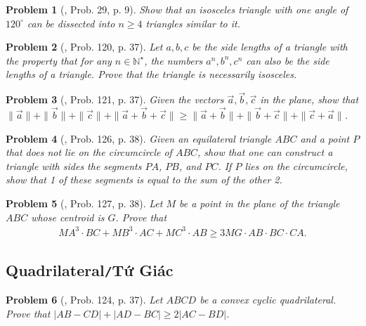 \documentclass[oneside]{book}
\numberwithin{equation}{section}
\newtheorem{problem}{Problem}[section]
\begin{document}
\begin{problem}[\cite{Gelca_Andreescu2017}, Prob. 29, p. 9]
	Show that an isosceles triangle with one angle of $120^\circ$ can be dissected into $n\ge 4$ triangles similar to it.
\end{problem}

\begin{problem}[\cite{Gelca_Andreescu2017}, Prob. 120, p. 37]
	Let $a,b,c$ be the side lengths of a triangle with the property that for any $n\in\mathbb{N}^\star$, the numbers $a^n,b^n,c^n$ can also be the side lengths of a triangle. Prove that the triangle is necessarily isosceles.
\end{problem}

\begin{problem}[\cite{Gelca_Andreescu2017}, Prob. 121, p. 37]
	Given the vectors $\vec{a},\vec{b},\vec{c}$ in the plane, show that $\|\vec{a}\| + \|\vec{b}\| + \|\vec{c}\| + \|\vec{a} + \vec{b} + \vec{c}\|\ge\|\vec{a} + \vec{b}\| + \|\vec{b} + \vec{c}\| + \|\vec{c} + \vec{a}\|$.
\end{problem}

\begin{problem}[\cite{Gelca_Andreescu2017}, Prob. 126, p. 38]
	Given an equilateral triangle $ABC$ and a point $P$ that does not lie on the circumcircle of $ABC$, show  that one can construct a triangle with sides the segments $PA$, $PB$, and $PC$. If $P$ lies on the circumcircle, show that 1 of these segments is equal to the sum of the other 2.
\end{problem}

\begin{problem}[\cite{Gelca_Andreescu2017}, Prob. 127, p. 38]
	Let $M$ be a point in the plane of the triangle $ABC$ whose centroid is $G$. Prove that
	\begin{align*}
		MA^3\cdot BC + MB^3\cdot AC + MC^3\cdot AB\ge 3MG\cdot AB\cdot BC\cdot CA.
	\end{align*}
\end{problem}

\subsection{Quadrilateral\texttt{/}Tứ Giác}

\begin{problem}[\cite{Gelca_Andreescu2017}, Prob. 124, p. 37]
	Let $ABCD$ be a convex cyclic quadrilateral. Prove that $|AB - CD| + |AD - BC|\ge 2|AC - BD|$.
\end{problem}
\end{document}
